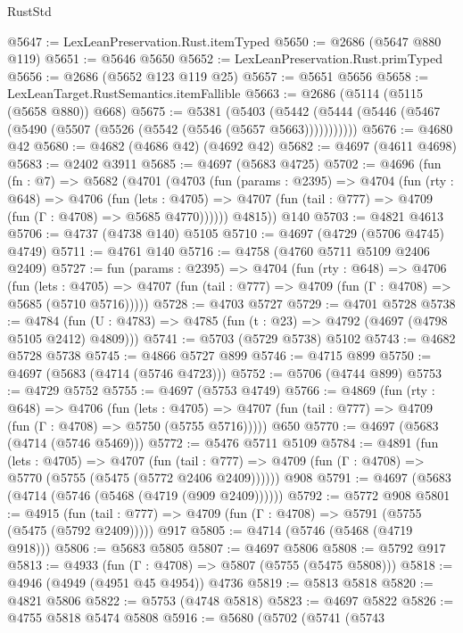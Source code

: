 \begin{lexlean}{RustStd}
\begin{coremodule}
@5647 := LexLeanPreservation.Rust.itemTyped
@5650 := @2686 (@5647 @880 @119)
@5651 := @5646 @5650
@5652 := LexLeanPreservation.Rust.primTyped
@5656 := @2686 (@5652 @123 @119 @25)
@5657 := @5651 @5656
@5658 := LexLeanTarget.RustSemantics.itemFallible
@5663 := @2686 (@5114 (@5115 (@5658 @880)) @668)
@5675 := @5381
    (@5403 (@5442 (@5444 (@5446 (@5467 (@5490 (@5507 (@5526 (@5542 (@5546 (@5657 @5663)))))))))))
@5676 := @4680 @42
@5680 := @4682 (@4686 @42) (@4692 @42)
@5682 := @4697 (@4611 @4698)
@5683 := @2402 @3911
@5685 := @4697 (@5683 @4725)
@5702 := @4696
    (fun (fn : @7) =>
    @5682
      (@4701
        (@4703
          (fun (params : @2395) =>
          @4704
            (fun (rty : @648) =>
            @4706
              (fun (lets : @4705) =>
              @4707 (fun (tail : @777) => @4709 (fun (Γ : @4708) => @5685 @4770))))))
        @4815))
    @140
@5703 := @4821 @4613
@5706 := @4737 (@4738 @140) @5105
@5710 := @4697 (@4729 (@5706 @4745) @4749)
@5711 := @4761 @140
@5716 := @4758 (@4760 @5711 @5109 @2406 @2409)
@5727 := fun (params : @2395) =>
  @4704
    (fun (rty : @648) =>
    @4706
      (fun (lets : @4705) =>
      @4707 (fun (tail : @777) => @4709 (fun (Γ : @4708) => @5685 (@5710 @5716)))))
@5728 := @4703 @5727
@5729 := @4701 @5728
@5738 := @4784 (fun (U : @4783) => @4785 (fun (t : @23) => @4792 (@4697 (@4798 @5105 @2412) @4809)))
@5741 := @5703 (@5729 @5738) @5102
@5743 := @4682 @5728 @5738
@5745 := @4866 @5727 @899
@5746 := @4715 @899
@5750 := @4697 (@5683 (@4714 (@5746 @4723)))
@5752 := @5706 (@4744 @899)
@5753 := @4729 @5752
@5755 := @4697 (@5753 @4749)
@5766 := @4869
    (fun (rty : @648) =>
    @4706
      (fun (lets : @4705) =>
      @4707 (fun (tail : @777) => @4709 (fun (Γ : @4708) => @5750 (@5755 @5716)))))
    @650
@5770 := @4697 (@5683 (@4714 (@5746 @5469)))
@5772 := @5476 @5711 @5109
@5784 := @4891
    (fun (lets : @4705) =>
    @4707
      (fun (tail : @777) => @4709 (fun (Γ : @4708) => @5770 (@5755 (@5475 (@5772 @2406 @2409))))))
    @908
@5791 := @4697 (@5683 (@4714 (@5746 (@5468 (@4719 (@909 @2409))))))
@5792 := @5772 @908
@5801 := @4915
    (fun (tail : @777) => @4709 (fun (Γ : @4708) => @5791 (@5755 (@5475 (@5792 @2409)))))
    @917
@5805 := @4714 (@5746 (@5468 (@4719 @918)))
@5806 := @5683 @5805
@5807 := @4697 @5806
@5808 := @5792 @917
@5813 := @4933 (fun (Γ : @4708) => @5807 (@5755 (@5475 @5808)))
@5818 := @4946 (@4949 (@4951 @45 @4954)) @4736
@5819 := @5813 @5818
@5820 := @4821 @5806
@5822 := @5753 (@4748 @5818)
@5823 := @4697 @5822
@5826 := @4755 @5818 @5474 @5808
@5916 := @5680
    (@5702
      (@5741
        (@5743

\end{coremodule}
\end{lexlean}
